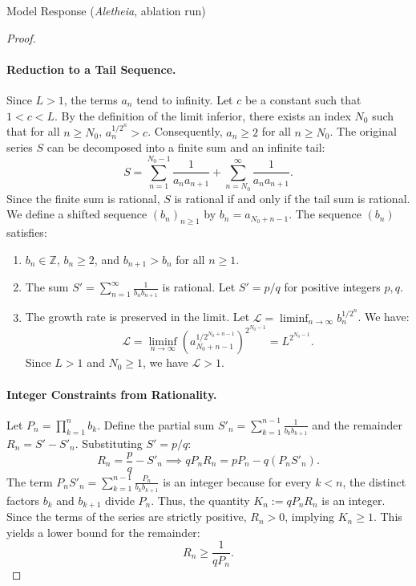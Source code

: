 \documentclass[11pt]{article}
\begin{document}
\begin{solution}{Model Response (\emph{Aletheia}, ablation run)}
\begin{proof}
\paragraph{Reduction to a Tail Sequence.}
Since $L > 1$, the terms $a_n$ tend to infinity. Let $c$ be a constant such that $1 < c < L$. By the definition of the limit inferior, there exists an index $N_0$ such that for all $n \ge N_0$, $a_n^{1/2^n} > c$. Consequently, $a_n \ge 2$ for all $n \ge N_0$. The original series $S$ can be decomposed into a finite sum and an infinite tail:
\[ S = \sum_{n=1}^{N_0-1} \frac{1}{a_n a_{n+1}} + \sum_{n=N_0}^\infty \frac{1}{a_n a_{n+1}}. \]
Since the finite sum is rational, $S$ is rational if and only if the tail sum is rational. We define a shifted sequence $(b_n)_{n \ge 1}$ by $b_n = a_{N_0 + n - 1}$. The sequence $(b_n)$ satisfies:
\begin{enumerate}
\item $b_n \in \mathbb{Z}$, $b_n \ge 2$, and $b_{n+1} > b_n$ for all $n \ge 1$.
\item The sum $S' = \sum_{n=1}^\infty \frac{1}{b_n b_{n+1}}$ is rational. Let $S' = p/q$ for positive integers $p, q$.
\item The growth rate is preserved in the limit. Let $\mathcal{L} = \liminf_{n \to \infty} b_n^{1/2^n}$. We have:
\[ \mathcal{L} = \liminf_{n \to \infty} \left( a_{N_0+n-1}^{1/2^{N_0+n-1}} \right)^{2^{N_0-1}} = L^{2^{N_0-1}}. \]
Since $L > 1$ and $N_0 \ge 1$, we have $\mathcal{L} > 1$.
\end{enumerate}

\paragraph{Integer Constraints from Rationality.}
Let $P_n = \prod_{k=1}^n b_k$. Define the partial sum $S'_n = \sum_{k=1}^{n-1} \frac{1}{b_k b_{k+1}}$ and the remainder $R_n = S' - S'_n$. Substituting $S' = p/q$:
\[ R_n = \frac{p}{q} - S'_n \implies q P_n R_n = p P_n - q (P_n S'_n). \]
The term $P_n S'_n = \sum_{k=1}^{n-1} \frac{P_n}{b_k b_{k+1}}$ is an integer because for every $k < n$, the distinct factors $b_k$ and $b_{k+1}$ divide $P_n$. Thus, the quantity $K_n := q P_n R_n$ is an integer. Since the terms of the series are strictly positive, $R_n > 0$, implying $K_n \ge 1$. This yields a lower bound for the remainder:
\begin{equation} \label{eq:Rn_lower}
R_n \ge \frac{1}{q P_n}.
\end{equation}


\end{proof}
\end{solution}
\end{document}
